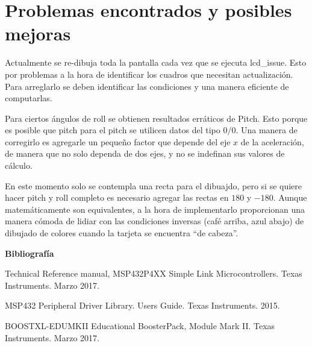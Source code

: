 \section{Problemas encontrados y posibles mejoras}

Actualmente se re-dibuja toda la pantalla cada vez que se ejecuta lcd\_issue. Esto por problemas a la
hora de identificar los cuadros que necesitan actualización. Para arreglarlo se deben identificar
las condiciones y una manera eficiente de computarlas.

Para ciertos ángulos de roll se obtienen resultados erráticos de Pitch. Esto porque es posible que
pitch para el pitch se utilicen datos del tipo $0/0$. Una manera de corregirlo es agregarle un
pequeño factor que depende del eje $x$ de la aceleración, de manera que no solo dependa de dos ejes,
y no se indefinan sus valores de cálculo.

En este momento solo se contempla una recta para el dibuajdo, pero si se quiere hacer pitch y roll
completo es necesario agregar las rectas en $180$ y $-180$. Aunque matemáticamente son equivalentes,
a la hora de implementarlo proporcionan una manera cómoda de lidiar con las condiciones inversas
(café arriba, azul abajo) de dibujado de colores cuando la tarjeta se encuentra ``de cabeza''.


\textbf{ Bibliografía}

Technical Reference manual, MSP432P4XX Simple Link Microcontrollers. Texas Instruments. Marzo 2017.

MSP432 Peripheral Driver Library. Users Guide. Texas Instruments. 2015.

BOOSTXL-EDUMKII Educational BoosterPack, Module Mark II. Texas Instruments. Marzo 2017.


%
%
